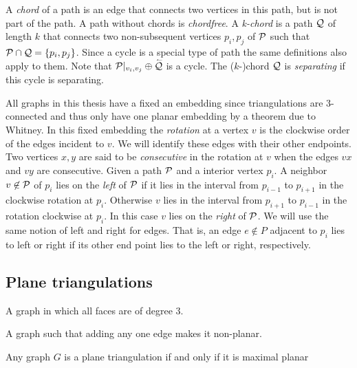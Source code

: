   A \emph{chord} of a path is an edge that connects two vertices in this path, but is not part of the path. A path without chords is \emph{chordfree}.
  A \emph{k-chord} is a path $\Q$ of length $k$ that connects two non-subsequent vertices $p_i, p_j$ of $\P$ such that $\P \cap \Q = \braces{p_i, p_j}$.
  Since a cycle is a special type of path the same definitions also apply to them.
  Note that $\P|_{v_i, v_j} \oplus \rev{\Q}$ is a cycle. The ($k$-)chord $\Q$ is \emph{separating} if this cycle is separating.

  All graphs in this thesis have a fixed an embedding since triangulations are 3-connected and thus only have one planar embedding by a theorem due to Whitney\cite{Bondy2008}. 
  In this fixed embedding the \emph{rotation} at a vertex $v$ is the clockwise order of the edges incident to $v$. We will identify these edges with their other endpoints.
  Two vertices $x, y$ are said to be \emph{consecutive} in the rotation at $v$ when the edges $vx$ and $vy$ are consecutive.
  Given a path $\P$ and a interior vertex $p_i$. A neighbor $v \nin \P$ of $p_i$ lies on the \emph{left} of $\P$ if it lies in the interval from $p_{i-1}$ to $p_{i+1}$ in the clockwise rotation at $p_{i}$. Otherwise $v$ lies in the interval from $p_{i+1}$ to $p_{i-1}$ in the rotation clockwise at $p_i$. In this case $v$ lies on the \emph{right} of $\P$.
  We will use the same notion of left and right for edges. That is, an edge $e\nin P$ adjacent to $p_i$ lies to left or right if its other end point lies to the left or right, respectively.

\subsection{Plane triangulations}

\begin{defi} 
A graph in which all faces are of degree $3$.
\end{defi}

\begin{defi} 
A graph such that adding any one edge makes it non-planar.
\end{defi}

\begin{thrm}
Any graph $G$ is a plane triangulation if and only if it is maximal planar
\end{thrm}

